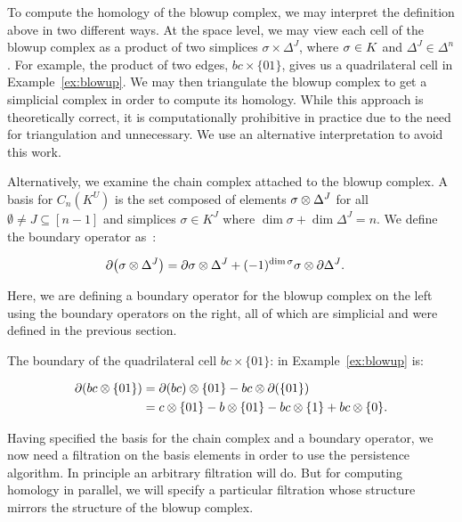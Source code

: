 \documentclass{jocg}
\begin{document}
To compute the homology of the blowup complex, we may interpret the definition 
above in two different ways.  
At the space level, we may view each cell of the blowup complex as a product 
of two simplices $\sigma \times \Delta^J$, where 
$\sigma \in K$ and $\Delta^J \in \Delta^n$.  
For example, the product of two edges, $bc \times \{01\}$, gives us a 
quadrilateral cell in Example~\ref{ex:blowup}.  
We may then triangulate the blowup complex to get a simplicial complex in order 
to compute its homology.  While this approach is theoretically correct, it is 
computationally prohibitive in practice due to the need for triangulation and 
unnecessary. We use an alternative interpretation to avoid this work.

Alternatively, we examine the chain complex attached to the blowup complex.
A basis for $C_n(K^U)$ is the set composed of elements 
$\sigma \otimes \Delta^J$ for all $\emptyset \not = J \subseteq [n-1]$ and 
simplices $\sigma \in K^J$ where $\dim{\sigma} + \dim{\Delta^J} = n$.  
We define the boundary operator as~\cite[\textrm{Lemma }4]{zc-lh-08}:
\begin{linenomath*}
\begin{align*}
\partial{\left (\sigma \otimes\Delta^J \right)}
&=
\partial{\sigma} \otimes \Delta^J + 
(-1)^{\dim{\sigma}}\sigma \otimes \partial\Delta^J.
\end{align*}
\end{linenomath*}
Here, we are defining a boundary operator for the blowup complex on the left 
using the boundary operators on the right, all of which are simplicial and were 
defined in the previous section. 
\begin{example}
The boundary of the quadrilateral cell 
$bc \times \{01\}$: in Example~\ref{ex:blowup} is:
\begin{linenomath*}
\begin{align*}
\partial{\left (bc \otimes\{01\} \right)}
&=
\partial{(bc)} \otimes \{01\} - bc \otimes \partial(\{01\}) \\
&= c \otimes \{01\} - b \otimes \{01\} - bc \otimes \{1\} + bc \otimes \{0\}.
\end{align*}
\end{linenomath*}
\end{example}
Having specified the basis for the chain complex and a boundary operator, 
we now need a filtration on the basis elements in order to use the 
persistence algorithm. In principle an arbitrary filtration will do.
But for computing homology in parallel, we will specify a particular filtration 
whose structure mirrors the structure of the blowup complex. 
\end{document}
